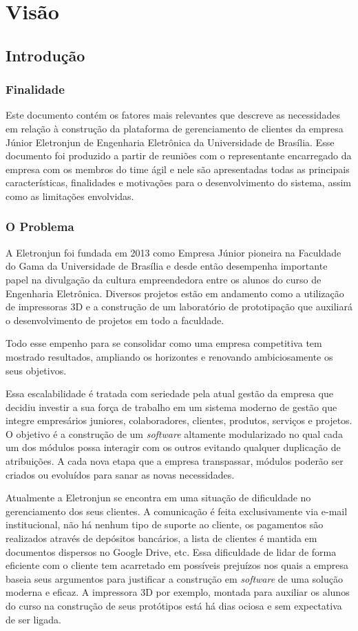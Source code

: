 \chapter{Visão}
  \section{Introdução}
    \subsection{Finalidade}
Este documento contém os fatores mais relevantes que descreve as necessidades em relação à construção da plataforma de gerenciamento de clientes da empresa Júnior Eletronjun de Engenharia Eletrônica da Universidade de Brasília. Esse documento foi produzido a partir de reuniões com o representante encarregado da empresa com os membros do time ágil e nele são apresentadas todas as principais características, finalidades e motivações para o desenvolvimento do sistema, assim como as limitações envolvidas.

    \subsection{O Problema}
A Eletronjun foi fundada em 2013 como Empresa Júnior pioneira na Faculdade do Gama da Universidade de Brasília e desde então desempenha importante papel na divulgação da cultura empreendedora entre os alunos do curso de Engenharia Eletrônica. Diversos projetos estão em andamento como a utilização de impressoras 3D e a construção de um laboratório de prototipação que auxiliará o desenvolvimento de projetos em todo a faculdade.

Todo esse empenho para se consolidar como uma empresa competitiva tem mostrado resultados, ampliando os horizontes e renovando ambiciosamente os seus objetivos.

Essa escalabilidade é tratada com seriedade pela atual gestão da empresa que decidiu investir a sua força de trabalho em um sistema moderno de gestão que integre empresários juniores, colaboradores, clientes, produtos, serviços e projetos. O objetivo é a construção de um \textit{software} altamente modularizado no qual cada um dos módulos possa interagir com os outros evitando qualquer duplicação de atribuições. A cada nova etapa que a empresa transpassar, módulos poderão ser criados ou evoluídos para sanar as novas necessidades.

Atualmente a Eletronjun se encontra em uma situação de dificuldade no gerenciamento dos seus clientes. A comunicação é feita exclusivamente via e-mail institucional, não há nenhum tipo de suporte ao cliente, os pagamentos são realizados através de depósitos bancários, a lista de clientes é mantida em documentos dispersos no Google Drive, etc. Essa dificuldade de lidar de forma eficiente com o cliente tem acarretado em possíveis prejuízos nos quais a empresa baseia seus argumentos para justificar a construção em \textit{software} de uma solução moderna e eficaz. A impressora 3D por exemplo, montada para auxiliar os alunos do curso na construção de seus protótipos está há dias ociosa e sem expectativa de ser ligada.


